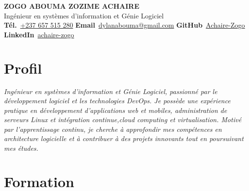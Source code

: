 \documentclass[12pt, a4paper]{article}
\begin{document}

\vspace{0.1cm}
\begin{center}
  {\fontsize{22}{28}\selectfont\bfseries\color{white}%
    ZOGO ABOUMA ZOZIME ACHAIRE}\\[5pt]
  {\large\color{accent!80!white}%
    Ing\'enieur en syst\`emes d'information et G\'enie Logiciel}\\[8pt]
  {\small\color{white}%
    \textbf{T\'el.}~\href{tel:+237657515280}{+237 657 515 280}\quad
    \textbf{Email}~\href{mailto:dylanabouma@gmail.com}{dylanabouma@gmail.com}\quad
    \textbf{GitHub}~\href{https://github.com/Achaire-Zogo}{Achaire-Zogo}\quad
    \textbf{LinkedIn}~\href{https://www.linkedin.com/in/achaire-zogo-b3b2331a9/}{achaire-zogo}%
  }
\end{center}
\vspace{0.5cm}

\section{Profil}

\textit{Ing\'enieur en syst\`emes d'information et G\'enie Logiciel, passionn\'e par le d\'eveloppement logiciel
et les technologies DevOps. Je poss\`ede une exp\'erience pratique en d\'eveloppement d'applications
web et mobiles, administration de serveurs Linux et int\'egration continue,cloud computing et virtualisation. Motiv\'e par l'apprentissage
continu, je cherche \`a approfondir mes comp\'etences en architecture logicielle et \`a contribuer
\`a des projets innovants tout en poursuivant mes \'etudes.}

\section{Formation}
\end{document}
